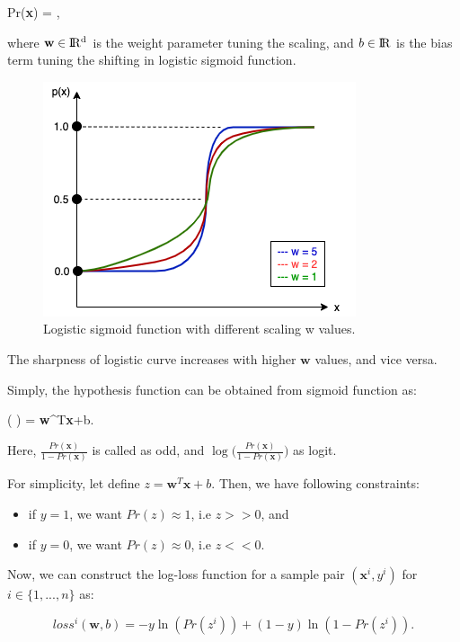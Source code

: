 \be
\label{eq:logistic_p}
Pr(\textbf{x}) = \:,
\ee

where $\textbf{w} \in \rm I\!R^{d}$ is the weight parameter tuning the scaling, and $b \in \rm I\!R$ is the bias term tuning the shifting in logistic sigmoid function.

\begin{figure}[h]
	\centering
	\includegraphics[width=.6\linewidth]{fig/logistic_function.png}
	\vspace*{2mm}
	\caption{Logistic sigmoid function with different scaling w values. }
	\label{logistic_function}
\end{figure}

The sharpness of logistic curve increases with higher $\textbf{w}$ values, and vice versa.

Simply, the hypothesis function can be obtained from sigmoid function as:

\be
\label{eq:logistic_hyptothesis}
\ln \Big ( \Big ) = \textbf{w}^{T}\textbf{x}+b\:.
\ee

Here, $\frac{Pr(\textbf{x})}{1 - Pr(\textbf{x})}$ is called as odd, and $\log \Big (\frac{Pr(\textbf{x})}{1 - Pr(\textbf{x})} \Big )$ as logit.

For simplicity, let define $z = \textbf{w}^{T}\textbf{x}+b$. Then, we have following constraints:

\begin{itemize}
    \item if $y = 1$, we want $Pr(z) \approx 1$, i.e $z >> 0$, and
    \item if $y = 0$, we want $Pr(z) \approx 0$, i.e $z << 0$.
\end{itemize}

Now, we can construct the log-loss function for a sample pair $(\textbf{x}^{i}, y^{i})$ for $i \in \{1, ..., n\}$ as:

\begin{equation}
\label{log_loss_onesample} 
loss^{i}(\textbf{w}, b) = -y\ln(Pr(z^{i}))  + (1-y)\ln(1-Pr(z^{i})).
\end{equation}

